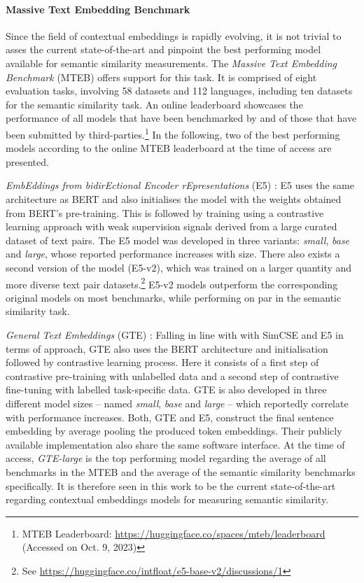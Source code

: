 \documentclass[11pt, numbers=noenddot]{scrreprt}
\let\citef\cite  %
\let\cite\parencite  %
\begin{document}
\paragraph{Massive Text Embedding Benchmark}
Since the field of contextual embeddings is rapidly evolving, it is not trivial to asses the current state-of-the-art and pinpoint the best performing model available for semantic similarity measurements.
The \textit{Massive Text Embedding Benchmark} (MTEB) \cite{muennighoffMTEBMassiveText2023} offers support for this task. It is comprised of eight evaluation tasks, involving 58 datasets and 112 languages, including ten datasets for the semantic similarity task. An online leaderboard showcases the performance of all models that have been benchmarked by \citef{muennighoffMTEBMassiveText2023} and of those that have been submitted by third-parties.\footnote{MTEB Leaderboard: \url{https://huggingface.co/spaces/mteb/leaderboard} (Accessed on Oct. 9, 2023)} In the following, two of the best performing models according to the online MTEB leaderboard at the time of access are presented.

\textit{EmbEddings from bidirEctional Encoder rEpresentations} (E5) \cite{wangTextEmbeddingsWeaklySupervised2022}:
E5 uses the same architecture as BERT and also initialises the model with the weights obtained from BERT's pre-training. This is followed by training using a contrastive learning approach with weak supervision signals derived from a large curated dataset of text pairs. The E5 model was developed in three variants: \textit{small}, \textit{base} and \textit{large}, whose reported performance increases with size. There also exists a second version of the model (E5-v2), which was trained on a larger quantity and more diverse text pair datasets.\footnote{See \url{https://huggingface.co/intfloat/e5-base-v2/discussions/1}} E5-v2 models outperform the corresponding original models on most benchmarks, while performing on par in the semantic similarity task.

\textit{General Text Embeddings} (GTE) \cite{liGeneralTextEmbeddings2023}: Falling in line with with SimCSE and E5 in terms of approach, GTE also uses the BERT architecture and initialisation followed by contrastive learning process. Here it consists of a first step of contrastive pre-training with unlabelled data and a second step of contrastive fine-tuning with labelled task-specific data. GTE is also developed in three different model sizes -- named \textit{small}, \textit{base} and \textit{large} -- which reportedly correlate with performance increases. Both, GTE and E5, construct the final sentence embedding by average pooling the produced token embeddings. Their publicly available implementation also share the same software interface. At the time of access, \textit{GTE-large} is the top performing model regarding the average of all benchmarks in the MTEB and the average of the semantic similarity benchmarks specifically. It is therefore seen in this work to be the current state-of-the-art regarding contextual embeddings models for measuring semantic similarity.
\end{document}
